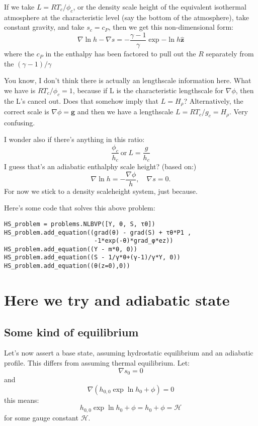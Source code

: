 \documentclass{aastex62}
\newcommand{\del}{\nabla}
\renewcommand{\vec}{\boldsymbol}
\newcommand{\scrH}{\mathcal{H}}
\begin{document}
If we take $L = R T_c/\phi_c$, or the density scale height of the equivalent isothermal atmosphere at the characteristic level (say the bottom of the atmosphere), take constant gravity, and take $s_c = c_P$, then we get this non-dimensional form:
\begin{equation}
  \del \ln h  - \del s = - \frac{\gamma-1}{\gamma}\exp{-\ln h} \vec{\hat{z}}
\end{equation}
where the $c_P$ in the enthalpy has been factored to pull out the $R$ separately from the $(\gamma-1)/\gamma$

You know, I don't think there is actually an lengthscale information here.  What we have is $R T_c/\phi_c = 1$, because if L is the characteristic lengthscale for $\del \phi$, then the L's cancel out.  Does that somehow imply that $L=H_\rho$?  Alternatively, the correct scale is $\del \phi = \vec{g}$ and then we have a lengthscale $ L = R T_c/g_c = H_\rho$.  Very confusing.

I wonder also if there's anything in this ratio:
\begin{equation}
  \frac{\phi_c}{h_c}~\text{or}~L=\frac{g}{h_c}
\end{equation}
I guess that's an adiabatic enthalphy scale height?
(based on:)
\begin{equation}
  \del \ln h = - \frac{\del \phi}{h}, \quad \del s = 0.
\end{equation}
For now we stick to a density scaleheight system, just because.

Here's some code that solves this above problem:
\begin{lstlisting}
HS_problem = problems.NLBVP([Υ, θ, S, τθ])
HS_problem.add_equation((grad(θ) - grad(S) + τθ*P1 ,
                         -1*exp(-θ)*grad_φ*ez))
HS_problem.add_equation((Υ - m*θ, 0))
HS_problem.add_equation((S - 1/γ*θ+(γ-1)/γ*Υ, 0))
HS_problem.add_equation((θ(z=0),0))
\end{lstlisting}

\section{Here we try and adiabatic state}

\subsection{Some kind of equilibrium}
Let's now assert a base state, assuming hydrostatic equilibrium and an adiabatic profile.  This differs from assuming thermal equilibrium.
Let:
\begin{equation}
  \del s_0 = 0
\end{equation}
and
\begin{equation}
  \del(h_{0,0}\exp{\ln h_0} + \phi) = 0
\end{equation}
this means:
\begin{equation}
  h_{0,0}\exp{\ln h_0} + \phi = h_0 + \phi = \scrH
\end{equation}
for some gauge constant $\scrH$.
\end{document}

